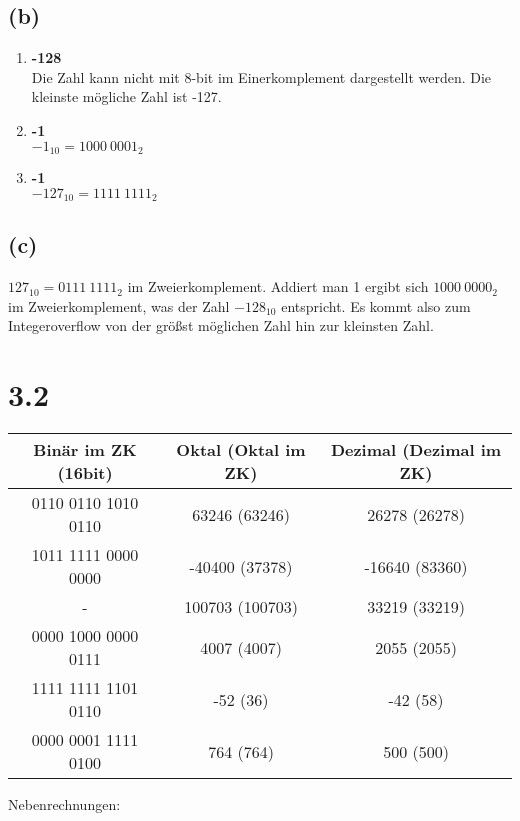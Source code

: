 \subsection*{(b)}
\begin{enumerate}
\item \textbf{-128}\\
Die Zahl kann nicht mit 8-bit im Einerkomplement dargestellt werden. Die kleinste mögliche Zahl ist -127.
\item \textbf{-1}\\
$-1_{10} = 1000\ 0001_2$
\item \textbf{-1}\\
$-127_{10} = 1111\ 1111_2$
\end{enumerate}
\subsection*{(c)}
$127_{10} = 0111\ 1111_2$ im Zweierkomplement. Addiert man 1 ergibt sich $1000\ 0000_2$ im Zweierkomplement, was der Zahl $-128_{10}$ entspricht. Es kommt also zum Integeroverflow von der größst möglichen Zahl hin zur kleinsten Zahl.

\section*{3.2}
\begin{center}
\begin{tabular}{|c|c|c|}
\hline
Binär im ZK (16bit) & Oktal (Oktal im ZK) & Dezimal (Dezimal im ZK) \\\hline\hline
0110 0110 1010 0110 & 63246 (63246) & 26278 (26278) \\\hline
1011 1111 0000 0000 & -40400 (37378) & -16640 (83360) \\\hline
- & 100703 (100703) & 33219 (33219) \\\hline
0000 1000 0000 0111 & 4007 (4007) & 2055 (2055) \\\hline
1111 1111 1101 0110 & -52 (36) & -42 (58) \\\hline
0000 0001 1111 0100 & 764 (764) & 500 (500) \\\hline
\end{tabular} 
\end{center}

Nebenrechnungen:

